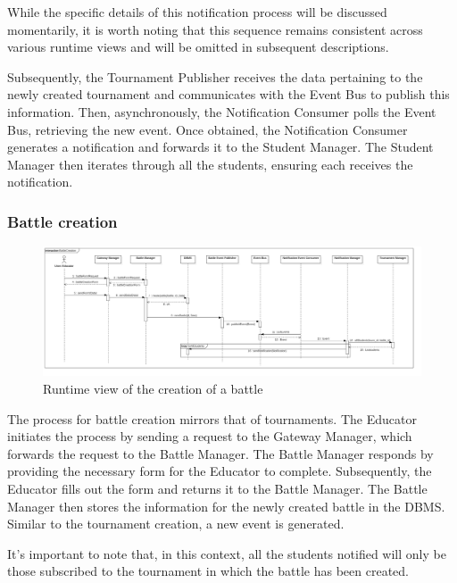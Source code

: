 While the specific details of this notification process will be discussed momentarily, it is worth noting that this sequence remains consistent across various runtime views and will be omitted in subsequent descriptions.

Subsequently, the Tournament Publisher receives the data pertaining to the newly created tournament and communicates with the Event Bus to publish this information. Then, asynchronously, the Notification Consumer polls the Event Bus, retrieving the new event. Once obtained, the Notification Consumer generates a notification and forwards it to the Student Manager. The Student Manager then iterates through all the students, ensuring each receives the notification.

\newpage

\subsubsection*{Battle creation}
\begin{figure}[h!]
    \centering
    \includegraphics[width=1.3\linewidth, angle=90]{2.ArchitecturalDesign/res/BattleCreation.jpg}
    \caption{Runtime view of the creation of a battle}
    \label{fig:battle_creation}
\end{figure}

The process for battle creation mirrors that of tournaments. The Educator initiates the process by sending a request to the Gateway Manager, which forwards the request to the Battle Manager. The Battle Manager responds by providing the necessary form for the Educator to complete. Subsequently, the Educator fills out the form and returns it to the Battle Manager. The Battle Manager then stores the information for the newly created battle in the DBMS. Similar to the tournament creation, a new event is generated.

It's important to note that, in this context, all the students notified will only be those subscribed to the tournament in which the battle has been created.

\newpage

